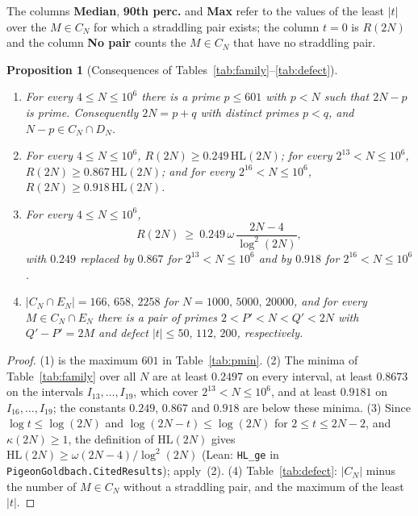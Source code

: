 \documentclass[11pt]{amsart}
\newtheorem{Proposition}[Theorem]{Proposition}
\theoremstyle{definition}
\theoremstyle{remark}
\begin{document}
The columns \textbf{Median}, \textbf{90th perc.} and \textbf{Max} refer to the values of the least $|t|$ over the $M\in C_N$ for which a straddling pair exists; the column $t=0$ is $R(2N)$ and the column \textbf{No pair} counts the $M\in C_N$ that have no straddling pair.
\begin{Proposition}[Consequences of Tables~\ref{tab:family}--\ref{tab:defect}]\label{prop:centering-data}
\begin{enumerate}
\item[\emph{(1)}] For every $4\leq N\leq 10^6$ there is a prime $p\leq 601$ with $p<N$ such that $2N-p$ is prime. Consequently $2N=p+q$ with distinct primes $p<q$, and $N-p\in C_N\cap D_N$.
\item[\emph{(2)}] For every $4\leq N\leq 10^6$, $R(2N)\geq 0.249\,\mathrm{HL}(2N)$; for every $2^{13}<N\leq 10^6$, $R(2N)\geq 0.867\,\mathrm{HL}(2N)$; and for every $2^{16}<N\leq 10^6$, $R(2N)\geq 0.918\,\mathrm{HL}(2N)$.
\item[\emph{(3)}] For every $4\leq N\leq 10^6$,
\[
R(2N)\ \geq\ 0.249\,\omega\,\frac{2N-4}{\log^2(2N)},
\]
with $0.249$ replaced by $0.867$ for $2^{13}<N\leq 10^6$ and by $0.918$ for $2^{16}<N\leq 10^6$.
\item[\emph{(4)}] $|C_N\cap E_N|=166,\,658,\,2258$ for $N=1000,\,5000,\,20000$, and for every $M\in C_N\cap E_N$ there is a pair of primes $2<P'<N<Q'<2N$ with $Q'-P'=2M$ and defect $|t|\leq 50,\,112,\,200$, respectively.
\end{enumerate}
\end{Proposition}
\begin{proof}
(1) is the maximum $601$ in Table~\ref{tab:pmin}. (2) The minima of Table~\ref{tab:family} over all $N$ are at least $0.2497$ on every interval, at least $0.8673$ on the intervals $I_{13},\dots,I_{19}$, which cover $2^{13}<N\leq 10^6$, and at least $0.9181$ on $I_{16},\dots,I_{19}$; the constants $0.249$, $0.867$ and $0.918$ are below these minima. (3) Since $\log t\leq\log(2N)$ and $\log(2N-t)\leq\log(2N)$ for $2\leq t\leq 2N-2$, and $\kappa(2N)\geq 1$, the definition of $\mathrm{HL}(2N)$ gives $\mathrm{HL}(2N)\geq \omega(2N-4)/\log^2(2N)$ (Lean: \texttt{HL\_ge} in \texttt{PigeonGoldbach.CitedResults}); apply~(2). (4) Table~\ref{tab:defect}: $|C_N|$ minus the number of $M\in C_N$ without a straddling pair, and the maximum of the least $|t|$.
\end{proof}
\end{document}
